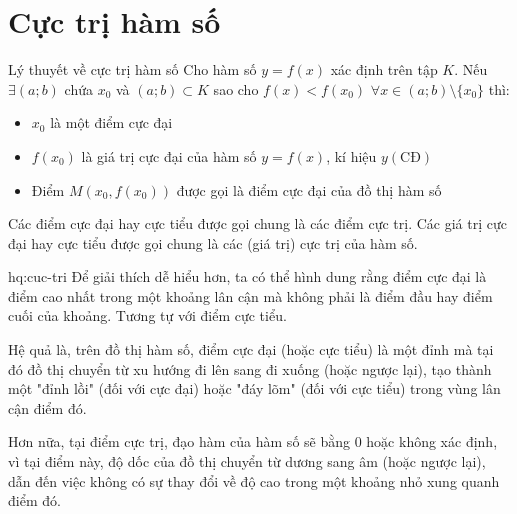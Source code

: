 \section{Cực trị hàm số}

\begin{lythuyetbox}{Lý thuyết về cực trị hàm số}
Cho hàm số $y = f(x)$ xác định trên tập $K$.
Nếu $\exists (a;b)$ chứa $x_0$ và $(a;b) \subset K$ sao cho $f(x) < f(x_0)$ $\forall x \in (a;b) \setminus \{x_0\}$ thì:
\begin{itemize}
    \item $x_0$ là một điểm cực đại
    \item $f(x_0)$ là giá trị cực đại của hàm số $y = f(x)$, kí hiệu $y(\mathrm{CĐ})$
    \item Điểm $M(x_0, f(x_0))$ được gọi là điểm cực đại của đồ thị hàm số
\end{itemize}
Các điểm cực đại hay cực tiểu được gọi chung là các điểm cực trị. Các giá trị cực đại hay cực tiểu được gọi chung là các (giá trị) cực trị của hàm số.

\vspace{1.5em} %

\begin{banchat}{}{hq:cuc-tri}
Để giải thích dễ hiểu hơn, ta có thể hình dung rằng điểm cực đại là điểm cao nhất trong một khoảng lân cận mà không phải là điểm đầu hay điểm cuối của khoảng. Tương tự với điểm cực tiểu.

\vspace{1.5em}

Hệ quả là, trên đồ thị hàm số, điểm cực đại (hoặc cực tiểu) là một đỉnh mà tại đó đồ thị chuyển từ xu hướng đi lên sang đi xuống (hoặc ngược lại), tạo thành một "đỉnh lồi" (đối với cực đại) hoặc "đáy lõm" (đối với cực tiểu) trong vùng lân cận điểm đó.

\vspace{1.5em}

Hơn nữa, tại điểm cực trị, đạo hàm của hàm số sẽ bằng 0 hoặc không xác định, vì tại điểm này, độ dốc của đồ thị chuyển từ dương sang âm (hoặc ngược lại), dẫn đến việc không có sự thay đổi về độ cao trong một khoảng nhỏ xung quanh điểm đó.



\end{banchat}
\end{lythuyetbox}

